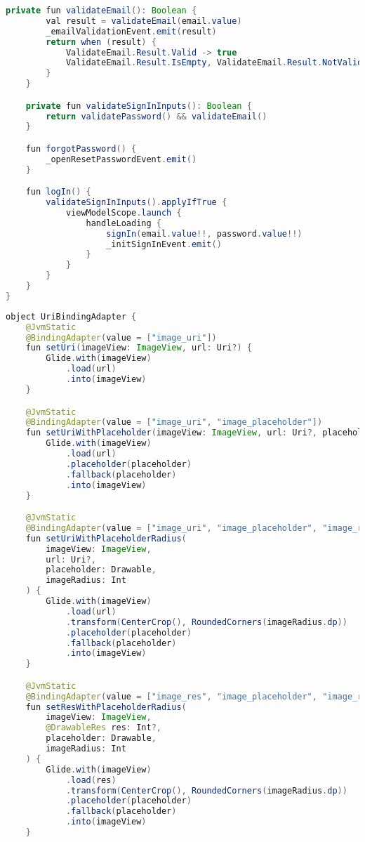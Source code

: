 \begin{asection}
\begin{lstlisting}[language=Java,label={lst:add:a_7}, caption={GestureDetectorCompat}]
    private fun validateEmail(): Boolean {
        val result = validateEmail(email.value)
        _emailValidationEvent.emit(result)
        return when (result) {
            ValidateEmail.Result.Valid -> true
            ValidateEmail.Result.IsEmpty, ValidateEmail.Result.NotValid -> false
        }
    }

    private fun validateSignInInputs(): Boolean {
        return validatePassword() && validateEmail()
    }

    fun forgotPassword() {
        _openResetPasswordEvent.emit()
    }

    fun logIn() {
        validateSignInInputs().applyIfTrue {
            viewModelScope.launch {
                handleLoading {
                    signIn(email.value!!, password.value!!)
                    _initSignInEvent.emit()
                }
            }
        }
    }
}
\end{lstlisting}
\begin{lstlisting}[language=Java,label={lst:add:a_8}, caption={UriBindingAdapter}]
object UriBindingAdapter {
    @JvmStatic
    @BindingAdapter(value = ["image_uri"])
    fun setUri(imageView: ImageView, url: Uri?) {
        Glide.with(imageView)
            .load(url)
            .into(imageView)
    }

    @JvmStatic
    @BindingAdapter(value = ["image_uri", "image_placeholder"])
    fun setUriWithPlaceholder(imageView: ImageView, url: Uri?, placeholder: Drawable) {
        Glide.with(imageView)
            .load(url)
            .placeholder(placeholder)
            .fallback(placeholder)
            .into(imageView)
    }

    @JvmStatic
    @BindingAdapter(value = ["image_uri", "image_placeholder", "image_radius"])
    fun setUriWithPlaceholderRadius(
        imageView: ImageView,
        url: Uri?,
        placeholder: Drawable,
        imageRadius: Int
    ) {
        Glide.with(imageView)
            .load(url)
            .transform(CenterCrop(), RoundedCorners(imageRadius.dp))
            .placeholder(placeholder)
            .fallback(placeholder)
            .into(imageView)
    }

    @JvmStatic
    @BindingAdapter(value = ["image_res", "image_placeholder", "image_radius"])
    fun setResWithPlaceholderRadius(
        imageView: ImageView,
        @DrawableRes res: Int?,
        placeholder: Drawable,
        imageRadius: Int
    ) {
        Glide.with(imageView)
            .load(res)
            .transform(CenterCrop(), RoundedCorners(imageRadius.dp))
            .placeholder(placeholder)
            .fallback(placeholder)
            .into(imageView)
    }


\end{lstlisting}
\end{asection}

